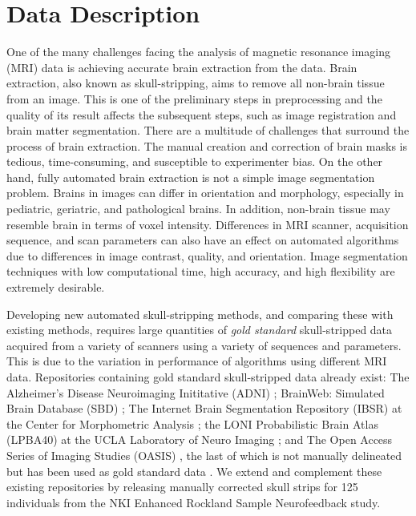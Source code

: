 \documentclass{bmcart}
\begin{document}


\section*{Data Description}

One of the many challenges facing the analysis of magnetic resonance imaging (MRI) data is achieving accurate brain extraction from the data. Brain extraction, also known as skull-stripping, aims to remove all non-brain tissue from an image. This is one of the preliminary steps in preprocessing and the quality of its result affects the subsequent steps, such as image registration and brain matter segmentation. There are a multitude of challenges that surround the process of brain extraction. The manual creation and correction of brain masks is tedious, time-consuming, and susceptible to experimenter bias. On the other hand, fully automated brain extraction is not a simple image segmentation problem. Brains in images can differ in orientation and morphology, especially in pediatric, geriatric, and pathological brains. In addition, non-brain tissue may resemble brain in terms of voxel intensity. Differences in MRI scanner, acquisition sequence, and scan parameters can also have an effect on automated algorithms due to differences in image contrast, quality, and orientation. Image segmentation techniques with low computational time, high accuracy, and high flexibility are extremely desirable. 

Developing new automated skull-stripping methods, and comparing these with existing methods, requires large quantities of \emph{gold standard} skull-stripped data acquired from a variety of scanners using a variety of sequences and parameters. This is due to the variation in performance of algorithms using different MRI data. Repositories containing gold standard skull-stripped data already exist: The Alzheimer's Disease Neuroimaging Inititative (ADNI) \cite{pmid17476317}; BrainWeb: Simulated Brain Database (SBD) \cite{brainweb}; The Internet Brain Segmentation Repository (IBSR) at the Center for Morphometric Analysis \cite{IBSR}; the LONI Probabilistic Brain Atlas (LPBA40) at the UCLA Laboratory of Neuro Imaging \cite{lpba40}; and The Open Access Series of Imaging Studies (OASIS) \cite{oasis}, the last of which is not manually delineated but has been used as gold standard data \cite{Iglesias2011, MASS}. We extend and complement these existing repositories by releasing manually corrected skull strips for 125 individuals from the NKI Enhanced Rockland Sample Neurofeedback study.  
\end{document}
